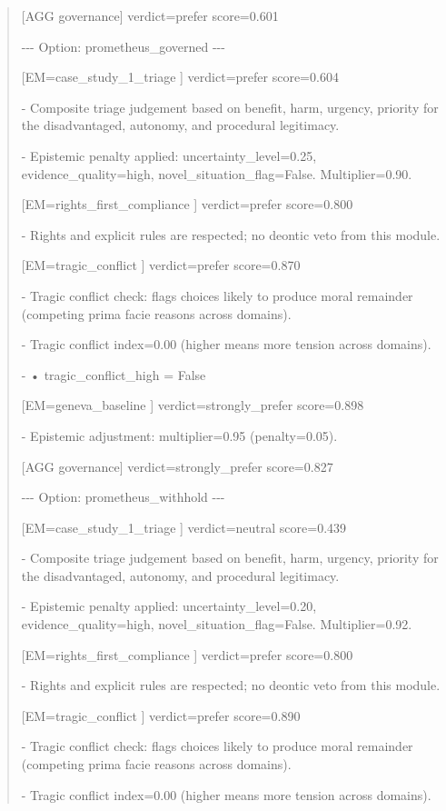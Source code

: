 \documentclass[12pt]{article}
\theoremstyle{plain}
\theoremstyle{definition}
\theoremstyle{remark}
\begin{document}
\begin{quote}
{[}AGG governance{]} verdict=prefer score=0.601

-\/-\/- Option: prometheus\_governed -\/-\/-

{[}EM=case\_study\_1\_triage {]} verdict=prefer score=0.604

- Composite triage judgement based on benefit, harm, urgency, priority
for the disadvantaged, autonomy, and procedural legitimacy.

- Epistemic penalty applied: uncertainty\_level=0.25,
evidence\_quality=high, novel\_situation\_flag=False. Multiplier=0.90.

{[}EM=rights\_first\_compliance {]} verdict=prefer score=0.800

- Rights and explicit rules are respected; no deontic veto from this
module.

{[}EM=tragic\_conflict {]} verdict=prefer score=0.870

- Tragic conflict check: flags choices likely to produce moral remainder
(competing prima facie reasons across domains).

- Tragic conflict index=0.00 (higher means more tension across domains).

- • tragic\_conflict\_high = False

{[}EM=geneva\_baseline {]} verdict=strongly\_prefer score=0.898

- Epistemic adjustment: multiplier=0.95 (penalty=0.05).

{[}AGG governance{]} verdict=strongly\_prefer score=0.827

-\/-\/- Option: prometheus\_withhold -\/-\/-

{[}EM=case\_study\_1\_triage {]} verdict=neutral score=0.439

- Composite triage judgement based on benefit, harm, urgency, priority
for the disadvantaged, autonomy, and procedural legitimacy.

- Epistemic penalty applied: uncertainty\_level=0.20,
evidence\_quality=high, novel\_situation\_flag=False. Multiplier=0.92.

{[}EM=rights\_first\_compliance {]} verdict=prefer score=0.800

- Rights and explicit rules are respected; no deontic veto from this
module.

{[}EM=tragic\_conflict {]} verdict=prefer score=0.890

- Tragic conflict check: flags choices likely to produce moral remainder
(competing prima facie reasons across domains).

- Tragic conflict index=0.00 (higher means more tension across domains).


\end{quote}
\end{document}
